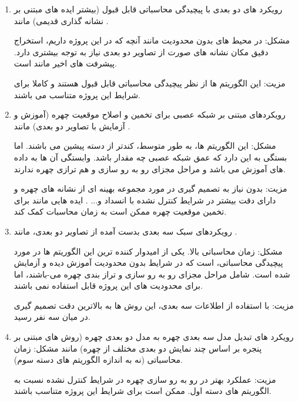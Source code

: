 \begin{enumerate}
\item
رویکرد های دو بعدی با پیچیدگی محاسباتی قابل قبول (بیشتر ایده های مبتنی بر نشانه گذاری  قدیمی) مانند 
\cite{HAGHIGHAT201623, LV2016465, amos2016openface, 6196234}.

\noindent
مشکل: در محیط های بدون محدودیت مانند آنچه که در این پروژه داریم، استخراج دقیق مکان نشانه های صورت از تصاویر دو بعدی نیاز به توجه بیشتری دارد. پیشرفت های اخیر مانند \cite{HAGHIGHAT201623} است.

\noindent
مزیت: این الگوریتم ها از نظر پیچیدگی محاسباتی  قابل قبول هستند و کاملا برای شرایط این پروژه متناسب می باشند.
\item 
رویکردهای مبتنی بر شبکه عصبی برای تخمین و اصلاح موقعیت چهره (آموزش و آزمایش با تصاویر دو بعدی) مانند 
\cite{wu2016facial, 7477555, 7780892, 7532959, 7298667}.

\noindent
مشکل: این الگوریتم ها، به طور متوسط، کندتر از دسته پیشین می باشند. اما بستگی به این دارد که عمق شبکه عصبی چه مقدار باشد. وابستگی آن ها به داده های آموزش می باشد و مراحل مجزای رو به رو سازی و هم ترازی چهره ندارند.

\noindent
مزیت: بدون نیاز به تصمیم گیری در مورد مجموعه بهینه ای از نشانه های چهره و دارای دقت بیشتر در شرایط کنترل نشده با انسداد و... . ایده هایی مانند \cite{Martino2015} برای تخمین موقعیت چهره ممکن است به زمان محاسبات کمک کند.
\item

رویکردهای سبک سه بعدی بدست آمده از تصاویر دو بعدی، مانند 
\cite{HU2017366, hassner2014effective, 7298679, 7006757, 6905796}.

\noindent
مشکل: زمان محاسباتی بالا. یکی از امیدوار کننده ترین این الگوریتم ها در مورد پیچیدگی محاسباتی، \cite{hassner2014effective} است که در شرایط بدون محدودیت آموزش دیده و آزمایش شده است. شامل مراحل مجزای رو به رو سازی و تراز بندی چهره می-باشند، اما برای محدودیت های این پروژه قابل استفاده نمی باشند.

\noindent
مزیت: با استفاده از اطلاعات سه بعدی، این روش ها به بالاترین دقت تصمیم گیری در میان سه نفر رسید.
\item
رویکرد های تبدیل مدل سه بعدی چهره به مدل دو بعدی چهره (روش های مبتنی بر پنجره  بر اساس چند نمایش دو بعدی مختلف از چهره) مانند \cite{DING2017144}
\noindent
مشکل: زمان محاسباتی (نه به اندازه الگوریتم های دسته سوم). 

\noindent
مزیت: عملکرد بهتر در رو به رو سازی چهره در شرایط کنترل نشده نسبت به الگوریتم های دسته اول. ممکن است برای شرایط این پروژه متناسب باشند.
\end{enumerate}

